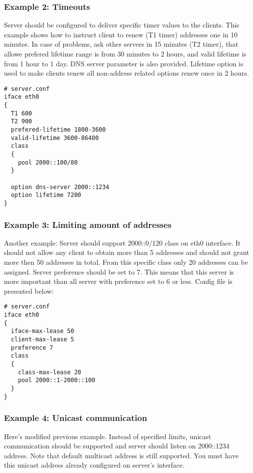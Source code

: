 \subsubsection{Example 2: Timeouts}
Server should be configured to deliver specific timer values to the
clients. This example shows how to instruct client to renew (T1 timer)
addresses one in 10 minutes. In case of problems, ask other servers in
15 minutes (T2 timer), that allowe prefered lifetime range is from 30
minutes to 2 hours, and valid lifetime is from 1 hour to 1 day. DNS
server parameter is also provided. Lifetime option is used to make
clients renew all non-address related options renew once in 2 hours.

\begin{lstlisting}
# server.conf
iface eth0
{
  T1 600
  T2 900
  prefered-lifetime 1800-3600
  valid-lifetime 3600-86400
  class
  {
    pool 2000::100/80
  }

  option dns-server 2000::1234
  option lifetime 7200
}
\end{lstlisting}

\subsubsection{Example 3: Limiting amount of addresses}
Another example: Server should support 2000::0/120 class on eth0
interface. It should not allow any client to obtain more than 5
addresses and should not grant more then 50 addresses in total. From
this specific class only 20 addresses can be assigned. Server
preference should be set to 7. This means that this server is more
important than all server with preference set to 6 or less.
Config file is presented below:

\begin{lstlisting}
# server.conf
iface eth0
{
  iface-max-lease 50
  client-max-lease 5
  preference 7
  class
  {
    class-max-lease 20
    pool 2000::1-2000::100
  }
}
\end{lstlisting}

\subsubsection{Example 4: Unicast communication}
\label{example-server-unicast}

Here's modified previous example. Instead of specified limits, unicast
communication should be supported and server should listen on
2000::1234 address. Note that default multicast address is still
supported. You must have this unicast address already configured on
server's interface.

